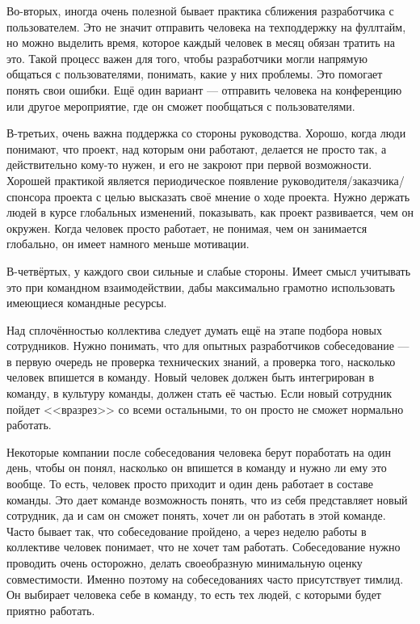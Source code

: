 \documentclass{../../text-style}
\begin{document}
Во-вторых, иногда очень полезной бывает практика сближения разработчика с пользователем. Это не значит отправить человека на техподдержку на фуллтайм, но можно выделить время, которое каждый человек в месяц обязан тратить на это. Такой процесс важен для того, чтобы разработчики могли напрямую общаться с пользователями, понимать, какие у них проблемы. Это помогает понять свои ошибки. Ещё один вариант --- отправить человека на конференцию или другое мероприятие, где он сможет пообщаться с пользователями.

В-третьих, очень важна поддержка со стороны руководства. Хорошо, когда люди понимают, что проект, над которым они работают, делается не просто так, а действительно кому-то нужен, и его не закроют при первой возможности. Хорошей практикой является периодическое появление руководителя/заказчика/спонсора проекта с целью высказать своё мнение о ходе проекта. Нужно держать людей в курсе глобальных изменений, показывать, как проект развивается, чем он окружен. Когда человек просто работает, не понимая, чем он занимается глобально, он имеет намного меньше мотивации.

В-четвёртых, у каждого свои сильные и слабые стороны. Имеет смысл учитывать это при командном взаимодействии, дабы максимально грамотно использовать имеющиеся командные ресурсы.

Над сплочённостью коллектива следует думать ещё на этапе подбора новых сотрудников. Нужно понимать, что для опытных разработчиков собеседование --- в первую очередь не проверка технических знаний, а проверка того, насколько человек впишется в команду. Новый человек должен быть интегрирован в команду, в культуру команды, должен стать её частью. Если новый сотрудник пойдет <<вразрез>> со всеми остальными, то он просто не сможет нормально работать.

Некоторые компании после собеседования человека берут поработать на один день, чтобы он понял, насколько он впишется в команду и нужно ли ему это вообще. То есть, человек просто приходит и один день работает в составе команды. Это дает команде возможность понять, что из себя представляет новый сотрудник, да и сам он сможет понять, хочет ли он работать в этой команде. Часто бывает так, что собеседование пройдено, а через неделю работы в коллективе человек понимает, что не хочет там работать. Собеседование нужно проводить очень осторожно, делать своеобразную минимальную оценку совместимости. Именно поэтому на собеседованиях часто присутствует тимлид. Он выбирает человека себе в команду, то есть тех людей, с которыми будет приятно работать.
\end{document}
